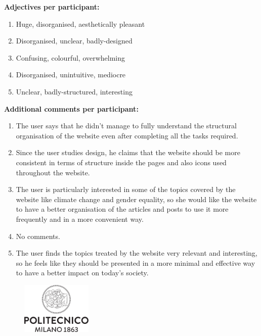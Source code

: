 \textbf{Adjectives per participant:}
\begin{enumerate}
	\item Huge, disorganised, aesthetically pleasant
	\item Disorganised, unclear, badly-designed
	\item Confusing, colourful, overwhelming
	\item Disorganised, unintuitive, mediocre
	\item Unclear, badly-structured, interesting
\end{enumerate}

\vspace{0.25cm}

\textbf{Additional comments per participant:}
\begin{enumerate}
	\item The user says that he didn't manage to fully understand the structural organisation of the website even after completing all the tasks required.
	\item Since the user studies design, he claims that the website should be more consistent in terms of structure inside the pages and also icons used throughout the website.
	\item The user is particularly interested in some of the topics covered by the website like climate change and gender equality, so she would like the website to have a better organisation of the articles and posts to use it more frequently and in a more convenient way.
	\item No comments.
	\item The user finds the topics treated by the website very relevant and interesting, so he feels like they should be presented in a more minimal and effective way to have a better impact on today's society.
\end{enumerate}



\clearpage
\null
\vfill
\centering
\pagestyle{empty}

\begin{figure}[b]
	\centering
	
	\includegraphics[width=0.3\textwidth]{res/Logo_poli}
\end{figure}

